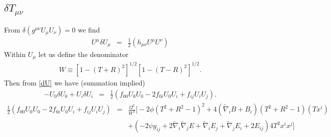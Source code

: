 \documentclass[10pt,letterpaper]{article}
\numberwithin{equation}{section}
\begin{document}
\subsection{$\delta T_{\mu\nu}$}
From $\delta(g^{\mu\nu}U_\mu U_\nu)=0$ we find
\begin{eqnarray}
U^\mu \delta U_\mu &=& \frac12 \left( h_{\mu\nu} U^\mu U^\nu\right)
\label{dU}
\end{eqnarray}
Within $U_\mu$ let us define the denominator
\begin{eqnarray}
W \equiv [1-(T+R)^2]^{1/2}[1-(T-R)^2]^{1/2}.
\end{eqnarray}
Then from \eqref{dU} we have (summation implied)
\begin{eqnarray}
-U_0 \delta U_0 + U_i \delta U_i &=& \frac12\left( f_{00} U_0 U_0 - 2 f_{0i} U_0 U_i + f_{ij} U_i U_j \right).
\end{eqnarray}
\begin{eqnarray}
\frac{1}{2}\left(f_{00} U_0 U_0 - 2 f_{0i} U_0 U_i + f_{ij} U_i U_j\right) &=& \frac{\Omega^2}{W^2}\big[ -2\phi(T^2+R^2-1)^2 +4(\tilde\nabla_i B+B_i)(T^2+R^2-1)(Tx^i)
\nonumber\\
&&+(-2\psi g_{ij}  + 2\tilde\nabla_i\tilde\nabla_j E+ \tilde\nabla_i E_j +\tilde\nabla_j E_i + 2E_{ij})4T^2 x^ix^j\big]
\end{eqnarray}
\end{document}
